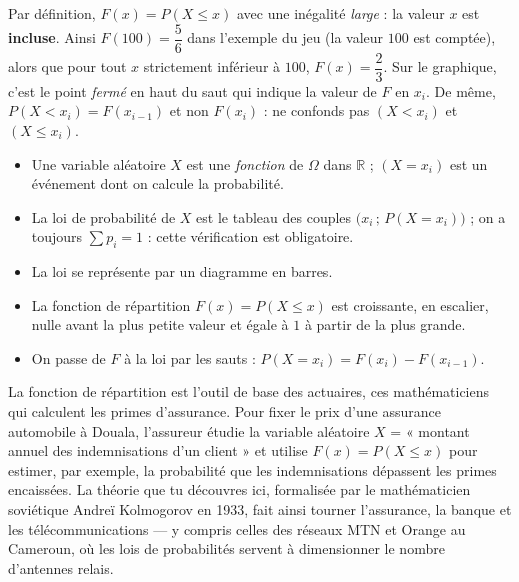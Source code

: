 \documentclass[11pt]{article}
\newcommand{\cle}[1]{{\popxbold\color{popdark}#1}}
\begin{document}
\begin{attention}
Par définition, $F(x) = P(X \leq x)$ avec une inégalité \emph{large} : la valeur $x$ est \textbf{incluse}. Ainsi $F(100) = \dfrac{5}{6}$ dans l'exemple du jeu (la valeur $100$ est comptée), alors que pour tout $x$ strictement inférieur à $100$, $F(x) = \dfrac{2}{3}$. Sur le graphique, c'est le point \emph{fermé} en haut du saut qui indique la valeur de $F$ en $x_i$. De même, $P(X < x_i) = F(x_{i-1})$ et non $F(x_i)$ : ne confonds pas $(X < x_i)$ et $(X \leq x_i)$.
\end{attention}

\begin{aretenir}
\begin{itemize}
\item Une \cle{variable aléatoire} $X$ est une \emph{fonction} de $\Omega$ dans $\mathbb{R}$ ; $(X = x_i)$ est un événement dont on calcule la probabilité.
\item La \cle{loi de probabilité} de $X$ est le tableau des couples $\big(x_i\,;\, P(X = x_i)\big)$ ; on a toujours $\sum p_i = 1$ : cette vérification est obligatoire.
\item La loi se représente par un \cle{diagramme en barres}.
\item La \cle{fonction de répartition} $F(x) = P(X \leq x)$ est croissante, en escalier, nulle avant la plus petite valeur et égale à $1$ à partir de la plus grande.
\item On passe de $F$ à la loi par les sauts : $P(X = x_i) = F(x_i) - F(x_{i-1})$.
\end{itemize}
\end{aretenir}

\begin{savaistu}
La fonction de répartition est l'outil de base des actuaires, ces mathématiciens qui calculent les primes d'assurance. Pour fixer le prix d'une assurance automobile à Douala, l'assureur étudie la variable aléatoire $X$ = « montant annuel des indemnisations d'un client » et utilise $F(x) = P(X \leq x)$ pour estimer, par exemple, la probabilité que les indemnisations dépassent les primes encaissées. La théorie que tu découvres ici, formalisée par le mathématicien soviétique Andreï Kolmogorov en 1933, fait ainsi tourner l'assurance, la banque et les télécommunications — y compris celles des réseaux MTN et Orange au Cameroun, où les lois de probabilités servent à dimensionner le nombre d'antennes relais.
\end{savaistu}
\end{document}
